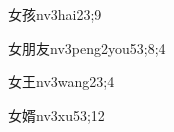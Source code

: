 \begin{verbete}{女孩}{nv3hai2}{3;9}
\end{verbete}

\begin{verbete}{女朋友}{nv3peng2you5}{3;8;4}
\end{verbete}

\begin{verbete}{女王}{nv3wang2}{3;4}
\end{verbete}

\begin{verbete}{女婿}{nv3xu5}{3;12}
\end{verbete}

